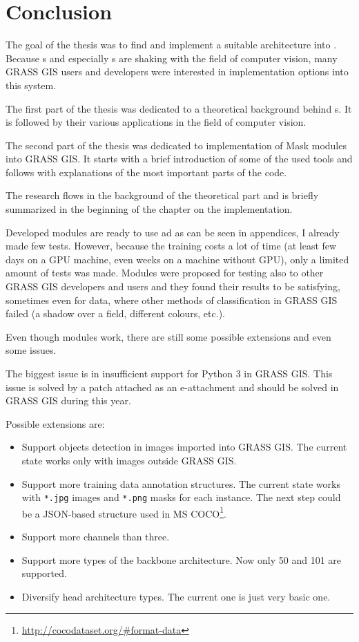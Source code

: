 \chapter{Conclusion}
\label{conclusion}

The goal of the thesis was to find and implement a suitable  
architecture into  . Because s and especially 
s are shaking with the field of computer vision, many GRASS GIS users 
and developers were interested in implementation options into this system.

The first part of the thesis was dedicated to a theoretical background behind 
s. It is followed by their various applications in the field of computer 
vision. 

The second part of the thesis was dedicated to implementation of Mask  
modules into GRASS GIS. It starts with a brief introduction of some of the used 
tools and follows with explanations of the most important parts of the code.

The research flows in the background of the theoretical part and is briefly 
summarized in the beginning of the chapter on the implementation.

Developed modules are ready to use ad as can be seen in appendices, I already 
made few tests. However, because the training costs a lot of time (at least few 
days on a GPU machine, even weeks on a machine without GPU), only a limited 
amount of tests was made. Modules were proposed for testing also to other GRASS 
GIS developers and users and they found their results to be satisfying, 
sometimes even for data, where other methods of classification in GRASS GIS 
failed (a shadow over a field, different colours, etc.).

Even though modules work, there are still some possible extensions and even some 
issues.

The biggest issue is in insufficient support for Python 3 in GRASS GIS. This 
issue is solved by a patch attached as an e-attachment and should be solved in 
GRASS GIS during this year.

Possible extensions are:
\begin{itemize}
	\item Support objects detection in images imported into GRASS GIS. The current state works only with images outside GRASS GIS.
	\item Support more training data annotation structures. The current state works with \verb|*.jpg| images and \verb|*.png| masks for each instance. The next step could be a JSON-based structure used in MS COCO\footnote{\url{http://cocodataset.org/\#format-data}}.
	\item Support more channels than three.
	\item Support more types of the backbone architecture. Now only  50 and  101 are supported.
	\item Diversify head architecture types. The current one is just very basic one.
\end{itemize}

